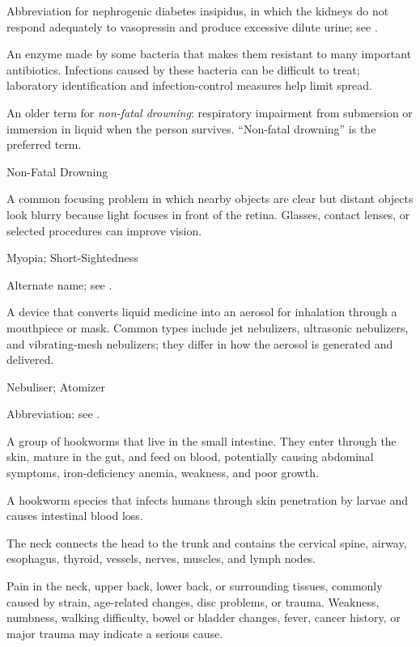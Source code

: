  Abbreviation for nephrogenic diabetes insipidus, in which the kidneys do not respond adequately to vasopressin and produce excessive dilute urine; see .

 An enzyme made by some bacteria that makes them resistant to many important antibiotics. Infections caused by these bacteria can be difficult to treat; laboratory identification and infection-control measures help limit spread.

 An older term for \textit{non-fatal drowning}: respiratory impairment from submersion or immersion in liquid when the person survives. “Non-fatal drowning” is the preferred term.

\synonyms
Non-Fatal Drowning

 A common focusing problem in which nearby objects are clear but distant objects look blurry because light focuses in front of the retina. Glasses, contact lenses, or selected procedures can improve vision.

\synonyms
Myopia; Short-Sightedness

 Alternate name; see .

 A device that converts liquid medicine into an aerosol for inhalation through a mouthpiece or mask. Common types include jet nebulizers, ultrasonic nebulizers, and vibrating-mesh nebulizers; they differ in how the aerosol is generated and delivered.

\synonyms
Nebuliser; Atomizer

 Abbreviation; see .

 A group of hookworms that live in the small intestine. They enter through the skin, mature in the gut, and feed on blood, potentially causing abdominal symptoms, iron-deficiency anemia, weakness, and poor growth.

 A hookworm species that infects humans through skin penetration by larvae and causes intestinal blood loss.

 The neck connects the head to the trunk and contains the cervical spine, airway, esophagus, thyroid, vessels, nerves, muscles, and lymph nodes.

 Pain in the neck, upper back, lower back, or surrounding tissues, commonly caused by strain, age-related changes, disc problems, or trauma. Weakness, numbness, walking difficulty, bowel or bladder changes, fever, cancer history, or major trauma may indicate a serious cause.

